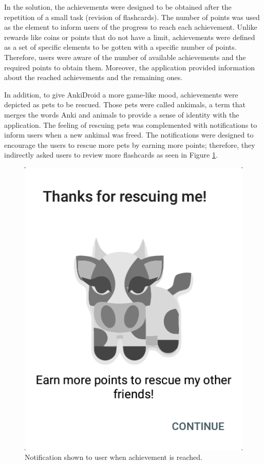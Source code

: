 In the solution, the achievements were designed to be obtained after the repetition of a small task (revision of flashcards). The number of points was used as the element to inform users of the progress to reach each achievement. Unlike rewards like coins or points that do not have a limit, achievements were defined as a set of specific elements to be gotten with a specific number of points. Therefore, users were aware of the number of available achievements and the required points to obtain them. Moreover, the application provided information about the reached achievements and the remaining ones.

In addition, to give AnkiDroid a more game-like mood, achievements were depicted as pets to be rescued. Those pets were called ankimals, a term that merges the words Anki and animals to provide a sense of identity with the application. The feeling of rescuing pets was complemented with notifications to inform users when a new ankimal was freed. The notifications were designed to encourage the users to rescue more pets by earning more points; therefore, they indirectly asked users to review more flashcards as seen in Figure \ref{fig:ankimals-rescue}.

\begin{figure}[htb]
    \vskip 5mm
        \begin{center}
            \includegraphics[scale=0.35]{./Figures/achievement_notification.png}
            \caption{Notification shown to user when achievement is reached.}
            \label{fig:ankimals-rescue}
        \end{center}
    \vskip -5mm
\end{figure}

